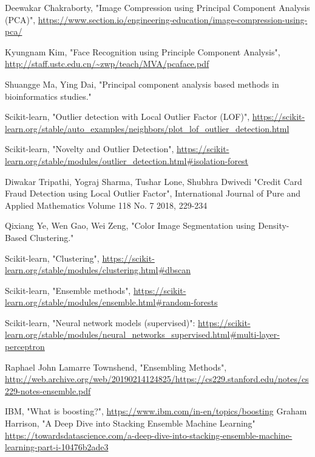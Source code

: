 \documentclass[conference]{IEEEtran}
\begin{document}
 
% 
\begin{thebibliography}{00}

 Deewakar Chakraborty, "Image Compression using Principal Component Analysis (PCA)", \url{https://www.section.io/engineering-education/image-compression-using-pca/}

 Kyungnam Kim, "Face Recognition using Principle Component Analysis", \url{http://staff.ustc.edu.cn/~zwp/teach/MVA/pcaface.pdf}

 Shuangge Ma, Ying Dai, "Principal component analysis based methods in bioinformatics studies."


 Scikit-learn, "Outlier detection with Local Outlier Factor (LOF)",  
\url{https://scikit-learn.org/stable/auto_examples/neighbors/plot_lof_outlier_detection.html}

 Scikit-learn, "Novelty and Outlier Detection", 
\url{https://scikit-learn.org/stable/modules/outlier_detection.html#isolation-forest}

 Diwakar Tripathi, Yograj Sharma, Tushar Lone, Shubhra Dwivedi "Credit Card Fraud Detection using Local Outlier Factor", International Journal of Pure and Applied Mathematics Volume 118 No. 7 2018, 229-234

 Qixiang Ye, Wen Gao, Wei Zeng, "Color Image Segmentation using Density-Based Clustering."

 Scikit-learn, "Clustering",  \url{https://scikit-learn.org/stable/modules/clustering.html#dbscan}

 Scikit-learn, "Ensemble methods",  \url{https://scikit-learn.org/stable/modules/ensemble.html#random-forests}

 Scikit-learn, "Neural network models (supervised)":
\url{https://scikit-learn.org/stable/modules/neural_networks_supervised.html#multi-layer-perceptron}

 Raphael John Lamarre Townshend, "Ensembling Methods", 
\url{http://web.archive.org/web/20190214124825/https://cs229.stanford.edu/notes/cs229-notes-ensemble.pdf}

 IBM, "What is boosting?", \url{https://www.ibm.com/in-en/topics/boosting}
 Graham Harrison, "A Deep Dive into Stacking Ensemble Machine Learning" \url{https://towardsdatascience.com/a-deep-dive-into-stacking-ensemble-machine-learning-part-i-10476b2ade3}


\end{thebibliography}
\end{document}
